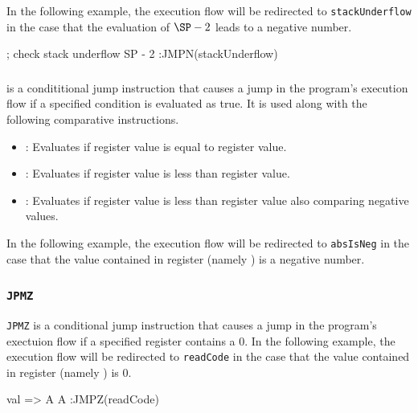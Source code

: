 In the following example, the execution flow will be redirected to \texttt{stackUnderflow} in the case that the evaluation of $\SP - 2$ leads to a negative number.

\begin{zkasm}
; check stack underflow
SP - 2          :JMPN(stackUnderflow)
\end{zkasm}





\subsubsection{\JMPC} %

\JMPC is a condititional jump instruction that causes a jump in the program's execution flow if a specified condition is evaluated  as true. It is used along with the following comparative instructions.
\begin{itemize}
\item \EQ: Evaluates if register \A value is equal to register \B value.
\item \LT: Evaluates if register \A value is less than register \B value.
\item \SLT: Evaluates if register \A value is less than register \B value also comparing negative values.
\end{itemize}

In the following example, the execution flow will be redirected to \texttt{absIsNeg} in the case that the value contained in register \A (namely \val) is a negative number.






\subsubsection{\texttt{JPMZ}} %

\texttt{JPMZ} is a conditional jump instruction that causes a jump in the program's exectuion flow if a specified register contains a 0. In the following example, the execution flow will be redirected to \texttt{readCode} in the case that the value contained in register \A (namely \val) is $0$.

\begin{zkasm}
val => A
A                   :JMPZ(readCode)
\end{zkasm}


